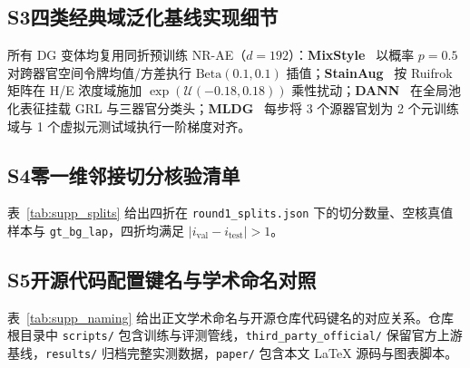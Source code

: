 \documentclass[journal]{IEEEtran}
\begin{document}
\subsection*{S3\quad 四类经典域泛化基线实现细节}
所有 DG 变体均复用同折预训练 NR-AE（$d=192$）：\textbf{MixStyle}~\cite{ref_mixstyle} 以概率 $p=0.5$ 对跨器官空间令牌均值/方差执行 $\text{Beta}(0.1, 0.1)$ 插值；\textbf{StainAug}~\cite{ref_stainaug} 按 Ruifrok 矩阵在 H/E 浓度域施加 $\exp(\mathcal{U}(-0.18, 0.18))$ 乘性扰动；\textbf{DANN}~\cite{ref_dann} 在全局池化表征挂载 GRL 与三器官分类头；\textbf{MLDG}~\cite{ref_mldg} 每步将 3 个源器官划为 2 个元训练域与 1 个虚拟元测试域执行一阶梯度对齐。

\subsection*{S4\quad 零一维邻接切分核验清单}
表~\ref{tab:supp_splits} 给出四折在 \texttt{round1\_splits.json} 下的切分数量、空核真值样本与 \texttt{gt\_bg\_lap}，四折均满足 $|i_{\text{val}} - i_{\text{test}}| > 1$。

\begin{table}[!t]
\centering
\caption{四器官 \texttt{UniPrior\_v2} 零一维索引邻接核验清单}\label{tab:supp_splits}
\footnotesize\setlength{\tabcolsep}{3.2pt}
\end{table}

\subsection*{S5\quad 开源代码配置键名与学术命名对照}
表~\ref{tab:supp_naming} 给出正文学术命名与开源仓库代码键名的对应关系。仓库根目录中 \texttt{scripts/} 包含训练与评测管线，\texttt{third\_party\_official/} 保留官方上游基线，\texttt{results/} 归档完整实测数据，\texttt{paper/} 包含本文 LaTeX 源码与图表脚本。
\end{document}
